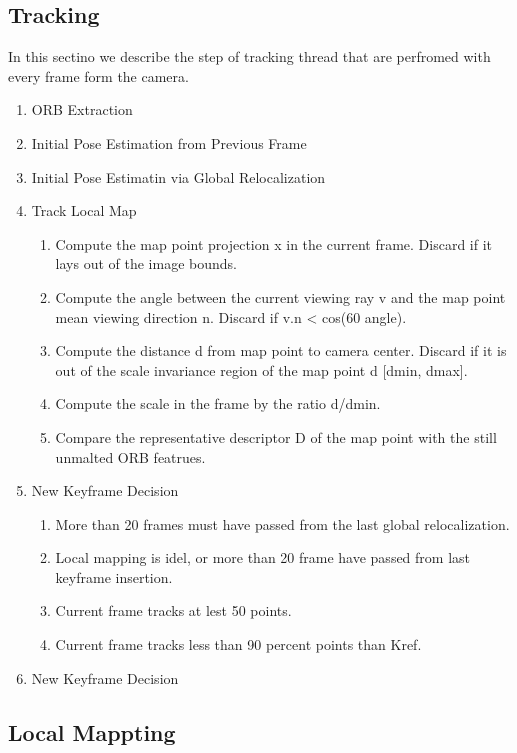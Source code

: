 \documentclass{article}
\begin{document}
\subsection{Tracking}
In this sectino we describe the step of tracking thread that are perfromed with every frame form the camera.
\begin{enumerate}
\item ORB Extraction
\item Initial Pose Estimation from Previous Frame
\item Initial Pose Estimatin via Global Relocalization
\item Track Local Map
	\begin{enumerate}
	\item Compute the map point projection x in the current frame. Discard if it lays out of the image bounds.
	\item Compute the angle between the current viewing ray v and the map point mean viewing direction n. Discard if v.n < cos(60 angle).
	\item Compute the distance d from map point to camera center. Discard if it is out of the scale invariance region of the map point d [dmin, dmax].
	\item Compute the scale in the frame by the ratio d/dmin.
	\item Compare the representative descriptor D of the map point with the still unmalted ORB featrues.
	\end{enumerate}
\item New Keyframe Decision
	\begin{enumerate}
	\item More than 20 frames must have passed from the last global relocalization.
	\item Local mapping is idel, or more than 20 frame have passed from last keyframe insertion.
	\item Current frame tracks at lest 50 points.
	\item Current frame tracks less than 90 percent points than Kref.
	\end{enumerate}
\item New Keyframe Decision
\end{enumerate}

\subsection{Local Mappting}
\end{document}
